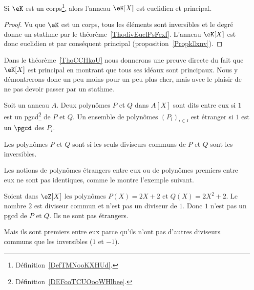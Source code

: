 \begin{lemma}       \label{LEMooIDSKooQfkeKp}
    Si \( \eK\) est un corps\footnote{Définition~\ref{DefTMNooKXHUd}.}, alors l'anneau \( \eK[X]\) est euclidien et principal.
\end{lemma}

\begin{proof}
    Vu que \( \eK\) est un corps, tous les éléments sont inversibles et le degré donne un stathme par le théorème~\ref{ThodivEuclPsFexf}. L'anneau \( \eK[X]\) est donc euclidien et par conséquent principal (proposition~\ref{Propkllxnv}).
\end{proof}

Dans le théorème~\ref{ThoCCHkoU} nous donnerons une preuve directe du fait que \( \eK[X]\) est principal en montrant que tous ses idéaux sont principaux. Nous y démontrerons donc un peu moins pour un peu plus cher, mais avec le plaisir de ne pas devoir passer par un stathme.

\begin{definition}  \label{DefDSFooZVbNAX}
    Soit un anneau \( A\). Deux polynômes \( P\) et \( Q\) dans \( A[X]\) sont dits  entre eux si \( 1\) est un pgcd\footnote{Définition~\ref{DEFooTCUOooWHlbee}.} de \( P\) et \( Q\). Un ensemble de polynômes \( (P_i)_{i\in I}\) est étranger  si \( 1\) est un \( \pgcd\) des \( P_i\).

Les polynômes \( P\) et \( Q\) sont  si les seuls diviseurs communs de \( P\) et \( Q\) sont les inversibles.
\end{definition}

Les notions de polynômes étrangers entre eux ou de polynômes premiers entre eux ne sont pas identiques, comme le montre l'exemple suivant.

\begin{example}
    Soient dans \( \eZ[X]\) les polynômes \( P(X)=2X+2\) et \( Q(X)=2X^2+2\). Le nombre \( 2\) est diviseur commun et n'est pas un diviseur de \( 1\). Donc \( 1\) n'est pas un pgcd de \( P\) et \( Q\). Ils ne sont pas étrangers.

    Mais ils sont premiers entre eux parce qu'ils n'ont pas d'autres diviseurs communs que les inversibles (\( 1\) et \( -1\)).
\end{example}

